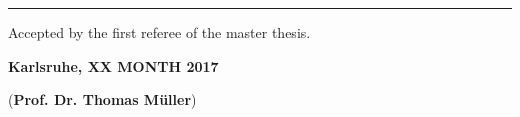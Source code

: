 \vspace*{\fill}

\rule{1.0\textwidth}{0.6pt}

\vspace*{0.75em}

Accepted by the first referee of the master thesis.

\textbf{Karlsruhe, XX MONTH 2017}

\vspace*{4em}

\dotfill \hspace*{8cm} 

\hspace*{0.82cm}(\textbf{Prof. Dr. Thomas M\"uller})